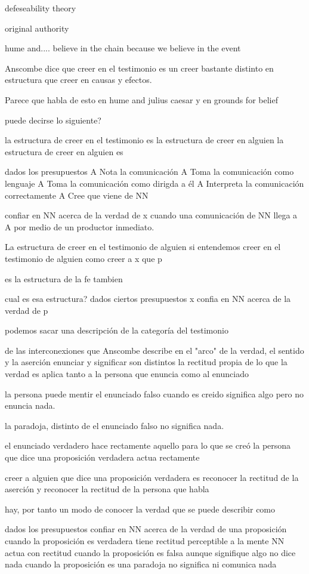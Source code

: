 defeseability theory

original authority

hume and.... believe in the chain because we believe in the event


Anscombe dice que creer en el testimonio es un creer bastante distinto en estructura
que creer en causas y efectos.

Parece que habla de esto en hume and julius caesar y en grounds for belief

puede decirse lo siguiente?

la estructura de creer en el testimonio es la estructura de creer en alguien
la estructura de creer en alguien es

dados los presupuestos
A Nota la comunicación
A Toma la comunicación como lenguaje
A Toma la comunicación como dirigda a él
A Interpreta la comunicación correctamente
A Cree que viene de NN

confiar en NN acerca de la verdad de x cuando una comunicación de NN llega a A por medio de un productor inmediato.

La estructura de creer en el testimonio de alguien
si entendemos creer en el testimonio de alguien como
creer a x que p

es la estructura de la fe tambien

cual es esa estructura?
dados ciertos presupuestos
x confia en NN acerca de la verdad de p

podemos sacar una descripción de
la categoría del testimonio

de las interconexiones que Anscombe describe
en el "arco" de la verdad, el sentido y la aserción
enunciar y significar son distintos
la rectitud propia de lo que la verdad es aplica tanto a la persona que enuncia como al enunciado

la persona puede mentir
el enunciado falso cuando es creido significa algo pero no enuncia nada.

la paradoja, distinto de el enunciado falso no significa nada.

el enunciado verdadero hace rectamente aquello para lo que se creó
la persona que dice una proposición verdadera actua rectamente

creer a alguien que dice una proposición verdadera es reconocer la rectitud de la aserción y reconocer la rectitud de la persona que habla

hay, por tanto un modo de conocer la verdad que se puede describir como

dados los presupuestos
confiar en NN acerca de la verdad de una proposición
cuando la proposición es verdadera tiene rectitud perceptible a la mente
NN actua con rectitud
cuando la proposición es falsa aunque signifique algo no dice nada
cuando la proposición es una paradoja no significa ni comunica nada

